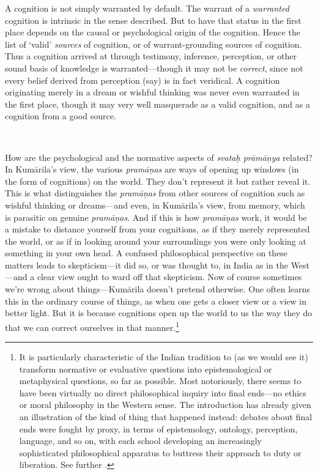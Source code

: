 \documentclass[11pt,letterpaper,oneside]{amsart}
\newcommand{\kum}{Kum\={a}rila}
\begin{document}
A cognition is not simply warranted by default. The warrant of a \emph{warranted} cognition is intrinsic in the sense described. But to have that status in the first place depends on the causal or psychological origin of the cognition. Hence the list of `valid' \emph{sources} of cognition, or of warrant-grounding sources of cognition. Thus a cognition arrived at through testimony, inference, perception, or other sound basis of knowledge is warranted---though it may not be \emph{correct}, since not every belief derived from perception (say) is in fact veridical. A cognition originating merely in a dream or wishful thinking was never even warranted in the first place, though it may very well masquerade as a valid cognition, and as a cognition from a good source.

\

How are the psychological and the normative aspects of \emph{svata\d h pr\=am\=a\d nya} related? In \kum's view, the various \emph{pram\=a\d nas} are ways of opening up windows (in the form of cognitions) on the world. They don't represent it but rather reveal it. This is what distinguishes the \emph{pram\=a\d nas} from other sources of cognition such as wishful thinking or dreams---and even, in Kum\=arila's view, from memory, which is parasitic on genuine \emph{pram\=a\d nas}. And if this is how \emph{pram\=a\d nas} work, it would be a mistake to distance yourself from your cognitions, as if they merely represented the world, or as if in looking around your surroundings you were only looking at something in your own head. A confused philosophical perspective on these matters leads to skepticism---it did so, or was thought to, in India as in the West---and a clear view ought to ward off that skepticism. Now of course sometimes we're wrong about things---Kum\=arila doesn't pretend otherwise. One often learns this in the ordinary course of things, as when one gets a closer view or a view in better light. But it is because cognitions open up the world to us the way they do that we can correct ourselves in that manner.\footnote{It is particularly characteristic of the Indian tradition to (as we would see it) transform normative or evaluative questions into epistemological or metaphysical questions, so far as possible. Most notoriously, there seems to have been virtually no direct philosophical inquiry into final ends---no ethics or moral philosophy in the Western sense. The introduction has already given an illustration of the kind of thing that happened instead: debates about final ends were fought by proxy, in terms of epistemology, ontology, perception, language, and so on, with each school developing an increasingly sophisticated philosophical apparatus to buttress their approach to duty or liberation. See further \citet{sen1984concept}.}
\end{document}
